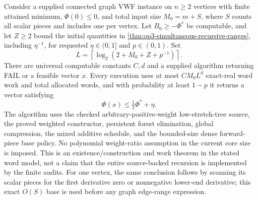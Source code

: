 \begin{theorem}
\label{thm:op3-complete-supplied-recursion}
Consider a supplied connected graph VWF instance on $n\geq2$ vertices with finite attained
minimum, $\Phi(0)\leq0$, and total input size $M_0=m+S$, where $S$
counts all scalar pieces and includes one per vertex. Let
$B_0\geq-\Phi^*$ be computable, and let $Z\geq2$ bound the initial
quantities in \cref{thm:op3-simultaneous-recursive-ranges}, including
$\eta^{-1}$, for requested $\eta\in(0,1]$ and $p\in(0,1)$.
Set
\[
 L=\left\lceil\log_2(2+M_0+Z+p^{-1})\right\rceil.
\]
There are universal computable constants $C,d$ and a supplied algorithm
returning \textnormal{FAIL} or a feasible vector $x$. Every execution
uses at most $CM_0L^d$ exact-real word work and total allocated words,
and with probability at least $1-p$ it returns a vector satisfying
\[
 \Phi(x)\leq\tfrac12\Phi^*+\eta.
\]
The algorithm uses the checked arbitrary-positive-weight low-stretch-tree
source, the proved weighted constructor, persistent forest elimination,
global compression, the mixed additive schedule, and the bounded-size
dense forward-piece base policy. No polynomial weight-ratio assumption
in the current core size is imposed. This is an existence/construction
and work theorem in the stated word model, not a claim that the entire
source-backed recursion is implemented by the finite audits.
For one vertex, the same conclusion follows by scanning its scalar
pieces for the first derivative zero or nonnegative lower-end derivative;
this exact $O(S)$ base is used before any graph edge-range expression.
\end{theorem}
